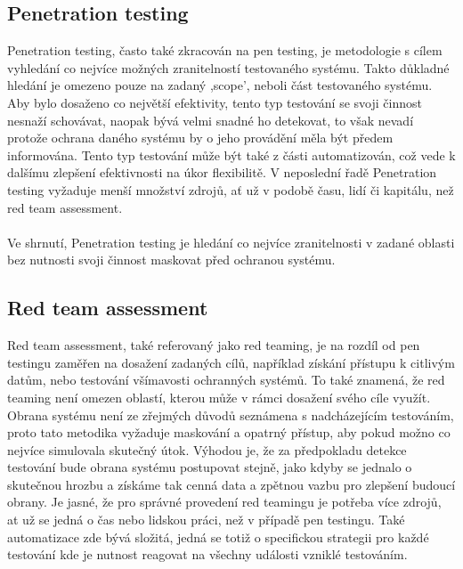 \subsection{Penetration testing}

Penetration testing, často také zkracován na pen testing, je metodologie s cílem vyhledání co nejvíce možných zranitelností testovaného systému.
Takto důkladné hledání je omezeno pouze na zadaný ,scope', neboli část testovaného systému.
Aby bylo dosaženo co největší efektivity, tento typ testování se svoji činnost nesnaží schovávat, naopak bývá velmi snadné ho detekovat, to však nevadí protože ochrana daného systému by o jeho provádění měla být předem informována.
Tento typ testování může být také z části automatizován, což vede k dalšímu zlepšení efektivnosti na úkor flexibilitě.
V neposlední řadě Penetration testing vyžaduje menší množství zdrojů, ať už v podobě času, lidí či kapitálu, než red team assessment.
\paragraph{}
Ve shrnutí, Penetration testing je hledání co nejvíce zranitelnosti v zadané oblasti bez nutnosti svoji činnost maskovat před ochranou systému.\cite{securityInteligence_pen_test_red_team_purple_team, lootsec_pen_test_vs_red_team, astra_pen_test_vs_red_teaming}


\subsection{Red team assessment}

Red team assessment, také referovaný jako red teaming, je na rozdíl od pen testingu zaměřen na dosažení zadaných cílů, například získání přístupu k citlivým datům, nebo testování všímavosti ochranných systémů.
To také znamená, že red teaming není omezen oblastí, kterou může v rámci dosažení svého cíle využít.
Obrana systému není ze zřejmých důvodů seznámena s nadcházejícím testováním, proto tato metodika vyžaduje maskování a opatrný přístup, aby pokud možno co nejvíce simulovala skutečný útok.
Výhodou je, že za předpokladu detekce testování bude obrana systému postupovat stejně, jako kdyby se jednalo o skutečnou hrozbu a získáme tak cenná data a zpětnou vazbu pro zlepšení budoucí obrany.
Je jasné, že pro správné provedení red teamingu je potřeba více zdrojů, at už se jedná o čas nebo lidskou práci, než v případě pen testingu.
Také automatizace zde bývá složitá, jedná se totiž o specifickou strategii pro každé testování kde je nutnost reagovat na všechny události vzniklé testováním.\cite{securityInteligence_pen_test_red_team_purple_team, lootsec_pen_test_vs_red_team, astra_pen_test_vs_red_teaming}

